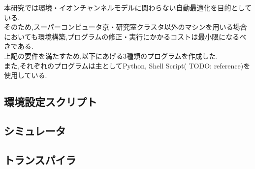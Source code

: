 本研究では環境・イオンチャンネルモデルに関わらない自動最適化を目的としている.\\
そのため,スーパーコンピュータ京・研究室クラスタ以外のマシンを用いる場合においても環境構築,プログラムの修正・実行にかかるコストは最小限になるべきである.\\
上記の要件を満たすため,以下にあげる3種類のプログラムを作成した.\\
また,それぞれのプログラムは主としてPython, Shell Script( TODO: reference)を使用している.\\
\subsection{環境設定スクリプト}


\subsection{シミュレータ}


\subsection{トランスパイラ}

